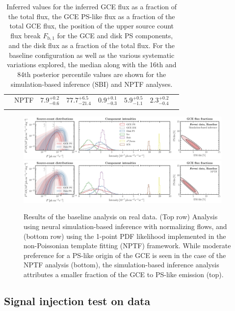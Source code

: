 \documentclass[prd,aps,10pt,nofootinbib,twocolumn,superscriptaddress,preprintnumbers,balancelastpage,longbibliography,floatfix]{revtex4-2}
\newcommand\Bstrut{\rule[-1.6ex]{0pt}{0pt}}   %
\begin{document}
\begin{table}[!t]
\begin{center}
\begin{tabular}{C{2.3cm}C{2cm}|C{2cm}C{2cm}C{2.2cm}C{2cm}C{2.2cm}C{2cm}}
& NPTF & $7.9^{+0.2}_{-0.6}$ & $77.7^{+6.5}_{-21.4}$ & $0.9^{+0.1}_{-0.3}$ & $5.9^{+0.5}_{-1.1}$ & $2.3^{+0.2}_{-0.4}$\Bstrut &\\
\botrule
\end{tabular}
\end{center}
\caption{Inferred values for the inferred GCE flux as a fraction of the total flux, the GCE PS-like flux as a fraction of the total GCE flux, the position of the upper source count flux break $F_{\mathrm{b}, 1}$ for the GCE and disk PS components, and the disk flux as a fraction of the total flux. For the baseline configuration as well as the various systematic variations explored, the median along with the 16th and 84th posterior percentile values are shown for the simulation-based inference (SBI) and NPTF analyses.}
\label{tab:results}
\end{table}    
%

%
\begin{figure}[!htbp]
\centering
\includegraphics[width=0.95\textwidth]{plots/data_fid_sbi.pdf}
\includegraphics[width=0.95\textwidth]{plots/data_fid_nptf.pdf}
\caption{Results of the baseline analysis on real \Fermi data. {(Top row)} Analysis using neural simulation-based inference with normalizing flows, and {(bottom row)} using the 1-point PDF likelihood implemented in the non-Poissonian template fitting (NPTF) framework. While moderate preference for a PS-like origin of the GCE is seen in the case of the NPTF analysis (bottom), the simulation-based inference analysis attributes a smaller fraction of the GCE to PS-like emission (top).}
\label{fig:fid_data}
\end{figure}
%

\subsection{Signal injection test on data}
\label{sec:sig-injection}
\end{document}
